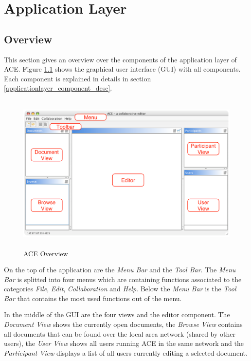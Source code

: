 \chapter{Application Layer}
\label{chapter:applicationlayer}

\section{Overview}
This section gives an overview over the components of the application layer of ACE. Figure \ref{applicationlayer_ace_overview} shows the graphical user interface (GUI) with all components. Each component is explained in details in section \ref{applicationlayer_component_desc}.
\begin{figure}[H]
\begin{center}
  \includegraphics[height=3.135in, width=5.01in]{../images/finalreport/application_ace_overview.eps}
\caption{ACE Overview}
\label{applicationlayer_ace_overview}
\end{center}
\end{figure}
On the top of the application are the \textit{Menu Bar} and the \textit{Tool Bar}. The \textit{Menu Bar} is splitted into four menus which are containing functions associated to the categories \textit{File}, \textit{Edit}, \textit{Collaboration} and \textit{Help}. Below the \textit{Menu Bar} is the \textit{Tool Bar} that contains the most used functions out of the menu.

In the middle of the GUI are the four views and the editor component. The \textit{Document View} shows the currently open documents, the \textit{Browse View} contains all documents that can be found over the local area network (shared by other users), the \textit{User View} shows all users running ACE in the same network and the \textit{Participant View} displays a list of all users currently editing a selected document.

